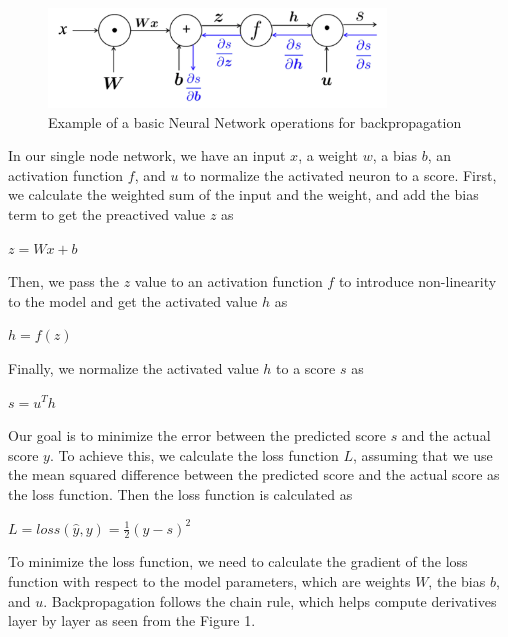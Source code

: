 \documentclass[12pt]{article}
\newcommand*\setcaptioncitation[1]{\def\captioncitation{\textit{Source:}~#1}}
\let\captioncitation\relax
\begin{document}
\begin{description}
  \begin{figure}[h]
    \centering
    \includegraphics[width=0.8\textwidth]{Picture1.png}
    \setcaptioncitation{Mohaisen, D. (2025). Lecture 6: Pitfalls in Word Vectors and Backpropagation
    [PowerPoint slides]. University of Central Florida Computer Understanding of Natural Language: http://www.cs.ucf.edu/}
    \caption{Example of a basic Neural Network operations for backpropagation}
  \end{figure}

  In our single node network, we have an input $x$, a weight $w$, a bias $b$, an activation function $f$, and $u$ to normalize the activated neuron to a score. First, we calculate the
  weighted sum of the input and the weight, and add the bias term to get the preactived value $z$ as 

  \begin{center}
    $z = Wx + b$
  \end{center}

  Then, we pass the $z$ value to an activation function $f$ to introduce non-linearity to the model and get the activated value $h$ as

  \begin{center}
    $h = f(z)$
  \end{center}

  Finally, we normalize the activated value $h$ to a score $s$ as

  \begin{center}
    $s = u^Th$
  \end{center}

  Our goal is to minimize the error between the predicted score $s$ and the actual score $y$. To achieve this, we calculate the loss function $L$, assuming that we use the mean squared difference between
  the predicted score and the actual score as the loss function. Then the loss function is calculated as

  \begin{center}
    $\displaystyle{L = loss(\hat{y}, y) = \frac{1}{2}(y - s)^2}$
  \end{center}

  To minimize the loss function, we need to calculate the gradient of the loss function with respect to the model parameters, which are weights $W$, the bias $b$, and $u$.
  Backpropagation follows the chain rule, which helps compute derivatives layer by layer as seen from the Figure 1.


\end{description}
\end{document}
